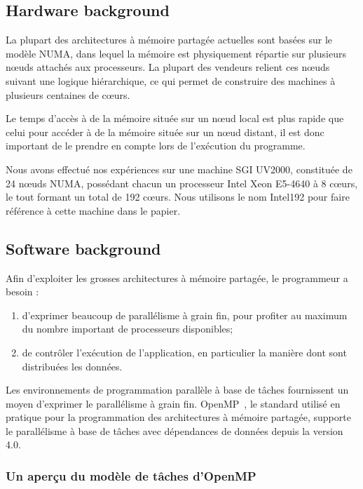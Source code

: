 \documentclass[parallelisme]{compas2016}
\begin{document}
\label{sec:background}
\subsection{Hardware background}
\label{sec:hardware}
La plupart des architectures à mémoire partagée actuelles sont basées sur le modèle NUMA,
dans lequel la mémoire est physiquement répartie sur plusieurs nœuds attachés
aux processeurs. La plupart des vendeurs relient ces nœuds suivant une logique
hiérarchique, ce qui permet de construire des machines à plusieurs centaines de cœurs.

Le temps d'accès à de la mémoire située sur un nœud local est plus rapide que celui
pour accéder à de la mémoire située sur un nœud distant, il est donc important
de le prendre en compte lors de l'exécution du programme.

Nous avons effectué nos expériences sur une machine SGI UV2000, constituée de
24 nœuds NUMA, possédant chacun un processeur Intel Xeon E5-4640 à 8 cœurs,
le tout formant un total de 192 cœurs. Nous utilisons le nom Intel192 pour faire
référence à cette machine dans le papier.

\subsection{Software background}

Afin d'exploiter les grosses architectures à mémoire partagée, le programmeur a besoin :
\begin{enumerate}
    \item d'exprimer beaucoup de parallélisme à grain fin, pour profiter au maximum du nombre
      important de processeurs disponibles;
    \item de contrôler l'exécution de l'application, en particulier la manière dont sont distribuées
      les données.
\end{enumerate}

Les environnements de programmation parallèle à base de tâches fournissent un moyen
d'exprimer le parallélisme à grain fin. OpenMP~\cite{openmp40}, le standard utilisé
en pratique pour la programmation des architectures à mémoire partagée, supporte
le parallélisme à base de tâches avec dépendances de données depuis la version 4.0.

\subsubsection{Un aperçu du modèle de tâches d'OpenMP}
\end{document}
